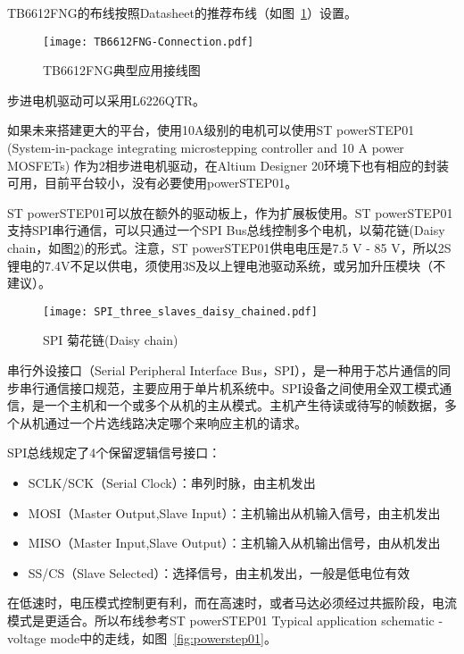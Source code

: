 TB6612FNG的布线按照Datasheet的推荐布线（如图~\ref{fig:TB6612FNG-Connection}）设置。

\begin{figure}[htbp]
    \centering
    \texttt{[image: TB6612FNG-Connection.pdf]}
    \caption{TB6612FNG典型应用接线图}
    \label{fig:TB6612FNG-Connection}
\end{figure}

步进电机驱动可以采用L6226QTR。

如果未来搭建更大的平台，使用10A级别的电机可以使用ST powerSTEP01 (System-in-package integrating microstepping controller and
10 A power MOSFETs) 作为2相步进电机驱动，在Altium Designer 20环境下也有相应的封装可用，目前平台较小，没有必要使用powerSTEP01。

ST powerSTEP01可以放在额外的驱动板上，作为扩展板使用。ST powerSTEP01支持SPI串行通信，可以只通过一个SPI Bus总线控制多个电机，以菊花链(Daisy chain，如图\ref{fig:SPI_three_slaves_daisy_chained})的形式。注意，ST powerSTEP01供电电压是7.5 V - 85 V，所以2S锂电的7.4V不足以供电，须使用3S及以上锂电池驱动系统，或另加升压模块（不建议）。

\begin{figure}[htbp]
    \centering
    \texttt{[image: SPI\_three\_slaves\_daisy\_chained.pdf]}
    \caption{SPI 菊花链(Daisy chain)}
    \label{fig:SPI_three_slaves_daisy_chained}
\end{figure}

串行外设接口（Serial Peripheral Interface Bus，SPI），是一种用于芯片通信的同步串行通信接口规范，主要应用于单片机系统中。SPI设备之间使用全双工模式通信，是一个主机和一个或多个从机的主从模式。主机产生待读或待写的帧数据，多个从机通过一个片选线路决定哪个来响应主机的请求。

SPI总线规定了4个保留逻辑信号接口：

\begin{itemize}
    \item SCLK/SCK（Serial Clock）：串列时脉，由主机发出
    \item MOSI（Master Output,Slave Input）：主机输出从机输入信号，由主机发出
    \item MISO（Master Input,Slave Output）：主机输入从机输出信号，由从机发出
    \item SS/CS（Slave Selected）：选择信号，由主机发出，一般是低电位有效
\end{itemize}

在低速时，电压模式控制更有利，而在高速时，或者马达必须经过共振阶段，电流模式是更适合。所以布线参考ST powerSTEP01 Typical application schematic - voltage mode中的走线，如图~\ref{fig:powerstep01}。

